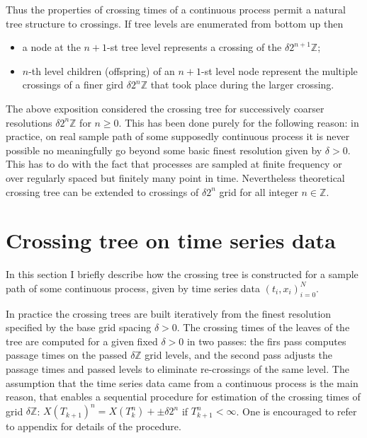 Thus the properties of crossing times of a continuous process permit a natural tree
structure to crossings. If tree levels are enumerated from bottom up then \begin{itemize}
	\item a node at the $n+1$-st tree level represents a crossing of the $\delta 2^{n+1} \mathbb{Z}$;
	\item $n$-th level children (offspring) of an $n+1$-st level node represent the
	multiple crossings of a finer gird $\delta 2^n \mathbb{Z}$ that took place during
	the larger crossing. 
\end{itemize}

The above exposition considered the crossing tree for successively coarser resolutions
$\delta 2^n \mathbb{Z}$ for $n\geq0$. This has been done purely for the following reason:
in practice, on real sample path of some supposedly continuous process it is never
possible no meaningfully go beyond some basic finest resolution given by $\delta>0$.
This has to do with the fact that processes are sampled at finite frequency or over
regularly spaced but finitely many point in time. Nevertheless theoretical crossing
tree can be extended to crossings of $\delta 2^n$ grid for all integer $n\in\mathbb{Z}$.


\section{Crossing tree on time series data} %
\label{sec:crossing_tree_on_time_series_data}

In this section I briefly describe how the crossing tree is constructed for a sample
path of some continuous process, given by time series data $(t_i, x_i)_{i=0}^N$.

In practice the crossing trees are built iteratively from the finest resolution
specified by the base grid spacing $\delta > 0$. The crossing times of the leaves
of the tree are computed for a given fixed $\delta>0$ in two passes: the firs pass
computes passage times on the passed $\delta \mathbb{Z}$ grid levels, and the second
pass adjusts the passage times and passed levels to eliminate re-crossings of the
same level. The assumption that the time series data came from a continuous process
is the main reason, that enables a sequential procedure for estimation of the crossing
times of grid $\delta\mathbb{Z}$: $X(T_{k+1})^n = X(T_k^n)+\pm\delta2^n$ if $T_{k+1}^n<\infty$.
One is encouraged to refer to appendix for details of the procedure.

